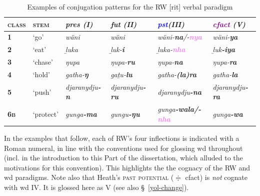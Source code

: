 \begin{table}[h]\caption[Ritharrŋu conjugation classes]{Examples of conjugation patterns for the \acrlong{RW} [\gls{rit}] verbal paradigm \citep[adapted from][63--6]{Heath1980r}}\label{rit.paradigm}\small
	\begin{tabular}{>{\bf}l>{\sc}l>{\it}l>{\it}l>{\it}l>{\it}l}\toprule
		\textsc{class} & \textsc{stem} & \textcolor{forest}{\gls{pres}} (\gls{I}) & \textcolor{ochre}{\gls{fut}} (\gls{II}) & \textcolor{blue}{\gls{pst}}\footnotemark (\gls{III})& \textcolor{purple}{\gls{cfact}} (\gls{V})\\\midrule
		1 & `go' &	wäni & wäni & wäni-\textbf{na}/-\textcolor{violet}{\textbf{nya}} & wäni-\textbf{ya}\\
 2& `eat' & ḻuka & ḻuk-\textbf{i} & ḻuka-\textcolor{violet}{\textbf{nha}}& ḻuk\textbf{-iya}\\
 3& `chase'& ŋupa& ŋupa-\textbf{ru}&ŋupa-\textbf{na} &ŋupa-\textbf{ra} \\
 4&`hold' & gatha-\textbf{ŋ} &gaṯu-\textbf{lu} &gatha-\textbf{(la)ra} & gatha-\textbf{la} \\
 5&`push' &djaranydju\textbf{-n} &djaranydju\textbf{-ru} &djaranydju\textbf{-na} &djaranydju\textbf{-ra} \\
 6\textsc{b}&`protect' &gunga\textbf{-ma} & gungu\textbf{-ŋu}& gunga\textbf{-wala/-\textcolor{violet}{nha}} & gunga\textbf{-wa}\\\bottomrule
	\end{tabular}
\end{table}

\noindent In the examples that follow, each of \acrshort{RW}'s four inflections is indicated with a Roman numeral, in line with the conventions used for glossing \acrshort{wd} throughout (incl. in the introduction to this Part of the dissertation, which alluded to the motivations for this convention). This highlights the the cognacy of the \acrshort{RW} and \acrshort{wd} paradigms. Note also that Heath's \textsc{past potential} ($ \doteqdot $ \gls{cfact}) is \textit{not} cognate with \acrshort{wd} \gls{IV}. It is glossed here as \gls{V} (see also \S~\ref{yol-change}).

